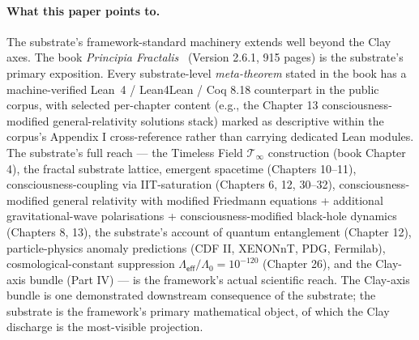 \documentclass[11pt,a4paper]{amsart}
\theoremstyle{plain}
\theoremstyle{definition}
\begin{document}
\paragraph{What this paper points to.} The substrate's framework-standard machinery extends well beyond the Clay axes. The book \emph{Principia Fractalis}~\cite{cohen2026book} (Version 2.6.1, 915 pages) is the substrate's primary exposition. Every substrate-level \emph{meta-theorem} stated in the book has a machine-verified Lean~4 / Lean4Lean / Coq 8.18 counterpart in the public corpus, with selected per-chapter content (e.g., the Chapter 13 consciousness-modified general-relativity solutions stack) marked as descriptive within the corpus's Appendix I cross-reference rather than carrying dedicated Lean modules. The substrate's full reach --- the Timeless Field $\mathcal{T}_\infty$ construction (book Chapter 4), the fractal substrate lattice, emergent spacetime (Chapters 10--11), consciousness-coupling via IIT-saturation (Chapters 6, 12, 30--32), consciousness-modified general relativity with modified Friedmann equations + additional gravitational-wave polarisations + consciousness-modified black-hole dynamics (Chapters 8, 13), the substrate's account of quantum entanglement (Chapter 12), particle-physics anomaly predictions (CDF II, XENONnT, PDG, Fermilab), cosmological-constant suppression $\Lambda_{\textsf{eff}}/\Lambda_0 = 10^{-120}$ (Chapter 26), and the Clay-axis bundle (Part IV) --- is the framework's actual scientific reach. The Clay-axis bundle is one demonstrated downstream consequence of the substrate; the substrate is the framework's primary mathematical object, of which the Clay discharge is the most-visible projection.
\end{document}
